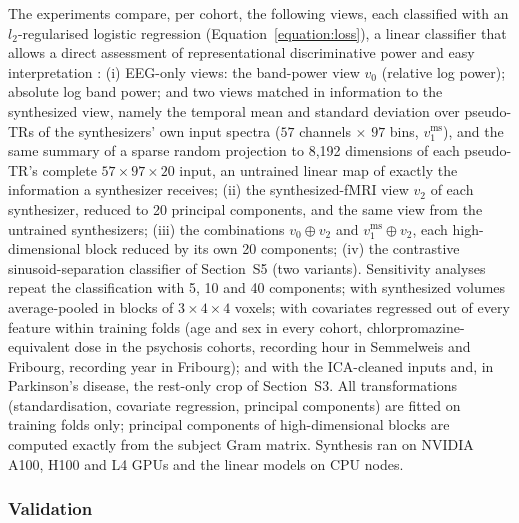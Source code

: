 \documentclass[10pt]{article}
\begin{document}
The experiments compare, per cohort, the following views, each classified with an $l_2$-regularised logistic regression (Equation~\ref{equation:loss}), a linear classifier that allows a direct assessment of representational discriminative power and easy interpretation \cite{treviso2020explanation}:
(i) EEG-only views: the band-power view $v_0$ (relative log power); absolute log band power; and two views matched in information to the synthesized view, namely the temporal mean and standard deviation over pseudo-TRs of the synthesizers' own input spectra ($57$ channels $\times$ $97$ bins, $v_1^{\mathrm{ms}}$), and the same summary of a sparse random projection \cite{li2006sparse} to 8,192 dimensions of each pseudo-TR's complete $57\times97\times20$ input, an untrained linear map of exactly the information a synthesizer receives;
(ii) the synthesized-fMRI view $v_2$ of each synthesizer, reduced to 20 principal components, and the same view from the untrained synthesizers;
(iii) the combinations $v_0 \oplus v_2$ and $v_1^{\mathrm{ms}} \oplus v_2$, each high-dimensional block reduced by its own 20 components;
(iv) the contrastive sinusoid-separation classifier of Section~S5 (two variants).
Sensitivity analyses repeat the classification with 5, 10 and 40 components; with synthesized volumes average-pooled in blocks of $3\times4\times4$ voxels; with covariates regressed out of every feature within training folds (age and sex in every cohort, chlorpromazine-equivalent dose in the psychosis cohorts, recording hour in Semmelweis and Fribourg, recording year in Fribourg); and with the ICA-cleaned inputs and, in Parkinson's disease, the rest-only crop of Section~S3. All transformations (standardisation, covariate regression, principal components) are fitted on training folds only; principal components of high-dimensional blocks are computed exactly from the subject Gram matrix. Synthesis ran on NVIDIA A100, H100 and L4 GPUs and the linear models on CPU nodes.

\subsubsection{Validation}\label{section:validation}
\end{document}
